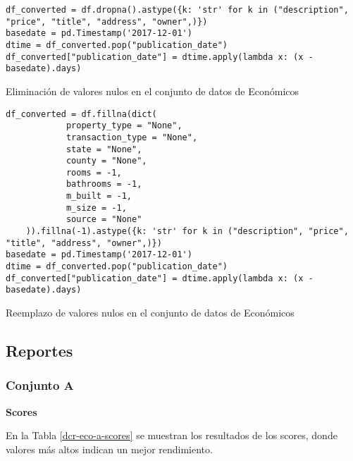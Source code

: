\begin{listing}[H]
    \begin{verbatim}
df_converted = df.dropna().astype({k: 'str' for k in ("description", "price", "title", "address", "owner",)})
basedate = pd.Timestamp('2017-12-01')
dtime = df_converted.pop("publication_date")
df_converted["publication_date"] = dtime.apply(lambda x: (x - basedate).days)
    \end{verbatim}
\caption{Eliminación de valores nulos en el conjunto de datos de Económicos}
\label{codigo-remove-nan}
\end{listing}

\begin{listing}[H]
    \begin{verbatim}
df_converted = df.fillna(dict(
            property_type = "None",
            transaction_type = "None",
            state = "None",
            county = "None",
            rooms = -1,
            bathrooms = -1,
            m_built = -1,
            m_size = -1,
            source = "None"
    )).fillna(-1).astype({k: 'str' for k in ("description", "price", "title", "address", "owner",)})
basedate = pd.Timestamp('2017-12-01')
dtime = df_converted.pop("publication_date")
df_converted["publication_date"] = dtime.apply(lambda x: (x - basedate).days)
    \end{verbatim}
\caption{Reemplazo de valores nulos en el conjunto de datos de Económicos}
\label{codigo-replace-nan}
\end{listing}



\subsection{Reportes}
\subsubsection{Conjunto A}
\label{ds-conjunto-a}

\textbf{Scores}

En la Tabla \ref{dcr-eco-a-scores} se muestran los resultados de los scores, donde valores más altos indican un mejor rendimiento.

